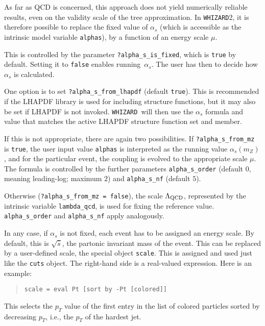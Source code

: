 \documentclass[12pt]{book}
\newcommand{\ttt}[1]{\texttt{#1}}
\newcommand{\whizard}{\texttt{WHIZARD}}
\begin{document}
As far as QCD is concerned, this approach does not yield numerically
reliable results, even on the validity scale of the tree approximation.
In \whizard 2, it is therefore possible to replace the fixed value of
$\alpha_s$ (which is accessible as the intrinsic model variable
\verb|alphas|), by a function of an energy scale $\mu$.

This is controlled by the parameter \verb|?alpha_s_is_fixed|, which is
\ttt{true} by default.  Setting it to \ttt{false} enables running~$\alpha_s$.
The user has then to decide how $\alpha_s$ is calculated.

One option is to set \verb|?alpha_s_from_lhapdf| (default \ttt{true}).  This
is recommended if the LHAPDF library is used for including structure
functions, but it may also be set if LHAPDF is not invoked.  \whizard\ will
then use the $\alpha_s$ formula and value that matches the active LHAPDF
structure function set and member.

If this is not appropriate, there are again two possibilities.  If
\verb|?alpha_s_from_mz| is \ttt{true}, the user input value \verb|alphas| is
interpreted as the running value $\alpha_s(m_Z)$, and for the particular
event, the coupling is evolved to the appropriate scale $\mu$.  The formula is
controlled by the further parameters \verb|alpha_s_order| (default $0$,
meaning leading-log; maximum $2$) and \verb|alpha_s_nf| (default $5$).

Otherwise (\verb|?alpha_s_from_mz = false|), the scale $\Lambda_{\rm QCD}$,
represented by the intrinsic variable \verb|lambda_qcd|, is used for fixing
the reference value.  \verb|alpha_s_order| and \verb|alpha_s_nf| apply
analogously.

In any case, if $\alpha_s$ is not fixed, each event has to be assigned an
energy scale.  By default, this is $\sqrt{\hat s}$, the partonic invariant
mass of the event.  This can be replaced by a user-defined scale, the special
object \ttt{scale}.  This is assigned and used just like the \ttt{cuts}
object.  The right-hand side is a real-valued expression.  Here is an example:
\begin{quote}
\begin{footnotesize}
\begin{verbatim}
scale = eval Pt [sort by -Pt [colored]]
\end{verbatim}
\end{footnotesize}
\end{quote}
This selects the $p_T$ value of the first entry in the list of colored
particles sorted by decreasing $p_T$, i.e., the $p_T$ of the hardest jet.
\end{document}
